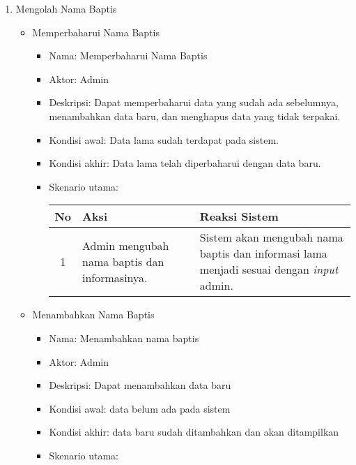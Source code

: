 \documentclass[a4paper,twoside]{article}
\begin{document}
\begin{enumerate}
\begin{enumerate}
\begin{enumerate}
                                \item Mengolah Nama Baptis
\begin{itemize}
\item Memperbaharui Nama Baptis
\begin{itemize}
                                        \item Nama: Memperbaharui Nama Baptis
                                        \item Aktor: Admin
                                        \item Deskripsi: Dapat memperbaharui data yang sudah ada sebelumnya, menambahkan data baru, dan menghapus data yang tidak terpakai.
                                        \item Kondisi awal: Data lama sudah terdapat pada sistem. %
                                        \item Kondisi akhir: Data lama telah diperbaharui dengan data baru. %
                                        \item Skenario utama:														
				
				\begin{center}
			  \begin{tabular}{ | c | p{5cm} |p{5cm} |}
			    \hline
			    No  & Aksi & Reaksi Sistem\\ \hline 
				1 & Admin mengubah nama baptis dan informasinya.%
				&  Sistem akan mengubah nama baptis dan informasi lama menjadi sesuai dengan \textit{input} admin.\\ \hline 
			    \end{tabular}
			\end{center} 

                                \end{itemize}
		\item Menambahkan Nama Baptis

                                \begin{itemize}
                                        \item Nama: Menambahkan nama baptis
                                        \item Aktor: Admin
                                        \item Deskripsi: Dapat menambahkan data baru
                                        \item Kondisi awal: data belum ada pada sistem %
                                        \item Kondisi akhir: data baru sudah ditambahkan dan akan ditampilkan%
                                        \item Skenario utama:														
				

\end{itemize}
\end{itemize}
\end{enumerate}
\end{enumerate}
\end{enumerate}
\end{document}
